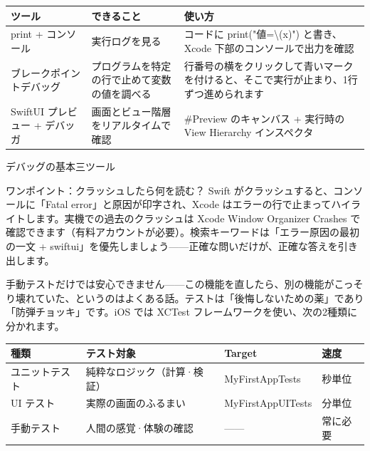 


\begin{center}
\begin{tabularx}{\linewidth}{|X|X|X|}
\hline
\textbf{ツール} & \textbf{できること} & \textbf{使い方} \tabularnewline
\hline
print + コンソール & 実行ログを見る & コードに print("値=\textbackslash{}(x)") と書き、Xcode 下部のコンソールで出力を確認 \tabularnewline
ブレークポイントデバッグ & プログラムを特定の行で止めて変数の値を調べる & 行番号の横をクリックして青いマークを付けると、そこで実行が止まり、1行ずつ進められます \tabularnewline
SwiftUI プレビュー + デバッガ & 画面とビュー階層をリアルタイムで確認 & \#Preview のキャンバス + 実行時の View Hierarchy インスペクタ \tabularnewline
\hline
\end{tabularx}
\end{center}

\begin{center}\small\color{gray}デバッグの基本三ツール\end{center}

\begin{tcbinfo}{ワンポイント：クラッシュしたら何を読む？}
Swift がクラッシュすると、コンソールに「Fatal error」と原因が印字され、Xcode はエラーの行で止まってハイライトします。実機での過去のクラッシュは Xcode Window Organizer Crashes で確認できます（有料アカウントが必要）。検索キーワードは「エラー原因の最初の一文 + swiftui」を優先しましょう——正確な問いだけが、正確な答えを引き出します。

\end{tcbinfo}


手動テストだけでは安心できません——この機能を直したら、別の機能がこっそり壊れていた、というのはよくある話。テストは「後悔しないための薬」であり「防弾チョッキ」です。iOS では XCTest フレームワークを使い、次の2種類に分かれます。

\begin{center}
\begin{tabularx}{\linewidth}{|X|X|X|X|}
\hline
\textbf{種類} & \textbf{テスト対象} & \textbf{Target} & \textbf{速度} \tabularnewline
\hline
ユニットテスト & 純粋なロジック（計算·検証） & MyFirstAppTests & 秒単位 \tabularnewline
UI テスト & 実際の画面のふるまい & MyFirstAppUITests & 分単位 \tabularnewline
手動テスト & 人間の感覚·体験の確認 & —— & 常に必要 \tabularnewline
\hline
\end{tabularx}
\end{center}

